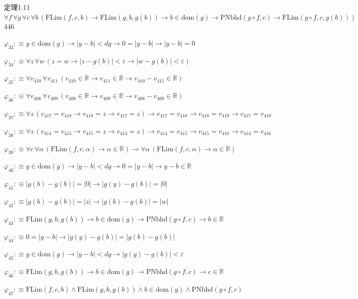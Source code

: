 \begin{fullproof}{定理1.11}{$\forall f\,\forall g\,\forall c\,\forall b\,(\mathrm{FLim}(f,c,b) \to \mathrm{FLim}(g,b,g(b)) \to b \in \mathrm{dom}(g) \to \mathrm{PNbhd}(g \circ f,c) \to \mathrm{FLim}(g \circ f,c,g(b)))$}{446}
\begin{abbrevlist}
\item $\varphi_{33} :\equiv y \in \mathrm{dom}(g) \to \lvert y - b \rvert < \mathit{dg} \to 0 = \lvert y - b \rvert \to \lvert y - b \rvert = 0$
\item $\varphi_{34} :\equiv \forall z\,\forall w\,(z = w \to \lvert z - g(b) \rvert < \varepsilon \to \lvert w - g(b) \rvert < \varepsilon)$
\item $\varphi_{35} :\equiv \forall v_{410}\,\forall v_{411}\,(v_{410} \in \mathbb{R} \to v_{411} \in \mathbb{R} \to v_{410} - v_{411} \in \mathbb{R})$
\item $\varphi_{36} :\equiv \forall v_{408}\,\forall v_{409}\,(v_{408} \in \mathbb{R} \to v_{409} \in \mathbb{R} \to v_{408} - v_{409} \in \mathbb{R})$
\item $\varphi_{37} :\equiv \forall z\,(v_{417} = v_{418} \to v_{418} = z \to v_{417} = z) \to v_{417} = v_{418} \to v_{418} = v_{419} \to v_{417} = v_{419}$
\item $\varphi_{38} :\equiv \forall z\,(v_{414} = v_{415} \to v_{415} = z \to v_{414} = z) \to v_{414} = v_{415} \to v_{415} = v_{416} \to v_{414} = v_{416}$
\item $\varphi_{39} :\equiv \forall c\,\forall \alpha\,(\mathrm{FLim}(f,c,\alpha) \to \alpha \in \mathbb{R}) \to \forall \alpha\,(\mathrm{FLim}(f,c,\alpha) \to \alpha \in \mathbb{R})$
\item $\varphi_{40} :\equiv y \in \mathrm{dom}(g) \to \lvert y - b \rvert < \mathit{dg} \to 0 = \lvert y - b \rvert \to y - b \in \mathbb{R}$
\item $\varphi_{41} :\equiv \lvert g(b) - g(b) \rvert = \lvert 0 \rvert \to \lvert g(y) - g(b) \rvert = \lvert 0 \rvert$
\item $\varphi_{42} :\equiv \lvert g(b) - g(b) \rvert = \lvert z \rvert \to \lvert g(b) - g(b) \rvert = \lvert w \rvert$
\item $\varphi_{43} :\equiv \mathrm{FLim}(g,b,g(b)) \to b \in \mathrm{dom}(g) \to \mathrm{PNbhd}(g \circ f,c) \to b \in \mathbb{R}$
\item $\varphi_{44} :\equiv 0 = \lvert y - b \rvert \to \lvert g(y) - g(b) \rvert = \lvert g(b) - g(b) \rvert$
\item $\varphi_{45} :\equiv y \in \mathrm{dom}(g) \to \lvert y - b \rvert < \mathit{dg} \to \lvert g(y) - g(b) \rvert < \varepsilon$
\item $\varphi_{46} :\equiv \mathrm{FLim}(g,b,g(b)) \to b \in \mathrm{dom}(g) \to \mathrm{PNbhd}(g \circ f,c) \to c \in \mathbb{R}$
\item $\varphi_{47} :\equiv \mathrm{FLim}(f,c,b) \land \mathrm{FLim}(g,b,g(b)) \land b \in \mathrm{dom}(g) \land \mathrm{PNbhd}(g \circ f,c)$

\end{abbrevlist}
\end{fullproof}
